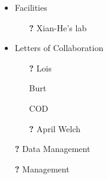 \documentclass[11pt]{NSFamsart}
\newcommand{\notyet}{\textbf{?}}
\newcommand{\done}{\checkmark}
\begin{document}
\begin{itemize}
\item Facilities
\begin{itemize}
\item[\notyet] Xian-He's lab
\end{itemize}

\item Letters of Collaboration
\begin{itemize}
\item[\notyet] Lois
\item[\done] Burt
\item[\done] COD
\item[\notyet] April Welch
\end{itemize}

\item[\notyet] Data Management

\item[\notyet] Management
\end{itemize}

\bigskip

\noindent
{}\\
 \\
 \\
 \\
\\
\\

\newpage \setcounter{page}{1} %


\end{document}
